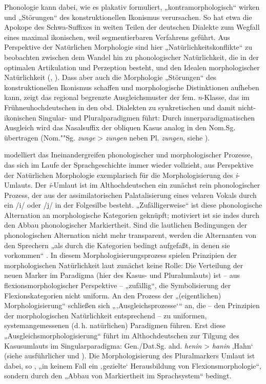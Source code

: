 \begin{sloppypar}
Phonologie kann dabei, wie es \citet[43]{Mayerthaler1981} plakativ formuliert, „kontramorphologisch“ wirken und „Störungen“ des konstruktionellen Ikonismus verursachen. So hat etwa die Apokope des Schwa-Suffixes in weiten Teilen der deutschen Dialekte zum Wegfall eines maximal ikonischen, weil segmentierbaren Verfahrens geführt. Aus Perspektive der Natürlichen Morphologie sind hier „Natürlichkeitskonflikte“ zu beobachten zwischen dem Wandel hin zu phonologischer Natürlichkeit, die in der optimalen Artikulation und Perzeption besteht, und den Idealen morphologischer Natürlichkeit (\citealt[30]{Wurzel1984}, \citealt[43--44]{Mayerthaler1981}). Dass aber auch die Morphologie „Störungen“ des konstruktionellen Ikonismus schaffen und morphologische Distinktionen aufheben kann, zeigt das regional begrenzte Ausgleichsmuster der fem. \textit{n}{}-Klasse, das im Frühneuhochdeutschen in den obd. Dialekten zu synkretischen und damit nicht-ikonischen Singular- und Pluralparadigmen führt: Durch innerparadigmatischen Ausgleich wird das Nasalsuffix der obliquen Kasus analog in den Nom.Sg. übertragen (Nom.""Sg. \textit{zunge} > \textit{zungen} neben Pl. \textit{zungen}, siehe ).
\end{sloppypar}

\citet{Wurzel1990} modelliert das Ineinandergreifen phonologischer und morphologischer Prozesse, das sich im Laufe der Sprachgeschichte immer wieder vollzieht, aus Perspektive der Natürlichen Morphologie exemplarisch für die Morphologisierung des \textit{i}{}-Umlauts. Der \textit{i}{}-Umlaut ist im Althochdeutschen ein zunächst rein phonologischer Prozess, der aus der assimilatorischen Palatalisierung eines velaren Vokals durch ein /i/ oder /j/ in der Folgesilbe besteht. „Zufälligerweise“ \citep[134]{Wurzel1990} ist diese phonologische Alternation an morphologische Kategorien geknüpft; motiviert ist sie indes durch den Abbau phonologischer Markiertheit. Sind die lautlichen Bedingungen der phonologischen Alternation nicht mehr transparent, werden die Alternanten von den Sprechern „als durch die Kategorien bedingt aufgefaßt, in denen sie vorkommen“ \citep[134]{Wurzel1990}. In diesem Morphologisierungsprozess spielen Prinzipien der morphologischen Natürlichkeit laut \citet[135]{Wurzel1990} zunächst keine Rolle: Die Verteilung der neuen Marker im Paradigma (hier des Kasus- und Pluralumlauts) ist -- aus flexionsmorphologischer Perspektive -- „zufällig“, die Symbolisierung der Flexionskategorien nicht uniform. An den Prozess der „(eigentlichen) Morphologisierung“ schließen sich „‚Ausgleichsprozesse‘“ an, die -- den Prinzipien der morphologischen Natürlichkeit entsprechend -- zu uniformen, systemangemessenen (d.\,h. natürlichen) Paradigmen führen. Erst diese „Ausgleichsmorphologisierung“ \citep[137]{Wurzel1990} führt im Althochdeutschen zur Tilgung des Kasusumlauts im Singularparadigma: Gen./Dat.Sg. ahd. \textit{henin} > \textit{hanin} ‚Hahn‘ (siehe ausführlicher  und ). Die Morphologisierung des Pluralmarkers Umlaut ist dabei, so \citet[138]{Wurzel1990}, „in keinem Fall ein ‚gezielte‘ Herausbildung von Flexionsmorphologie“, sondern durch den „Abbau von Markiertheit im Sprachsystem“ bedingt.

